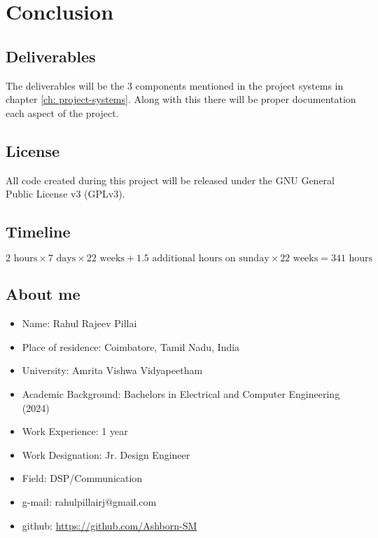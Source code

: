 \chapter{Conclusion}

\section{Deliverables}

The deliverables will be the 3 components mentioned in the project systems in chapter \ref{ch: project-systems}. Along with this there will be proper documentation each aspect of the project.

\section{License}

All code created during this project will be released under the GNU General Public License v3 (GPLv3).

\section{Timeline}

$$ 2 \text{ hours} \times 7 \text{ days} \times 22 \text{ weeks} + 1.5 \text{ additional hours on sunday} \times 22 \text{ weeks} = 341 \text{ hours}
$$
\section{About me}

\begin{itemize}
	\item Name: Rahul Rajeev Pillai
	\item Place of residence: Coimbatore, Tamil Nadu, India
	\item University: Amrita Vishwa Vidyapeetham
	\item Academic Background: Bachelors in Electrical and Computer Engineering (2024)
	\item Work Experience: 1 year
	\item Work Designation: Jr. Design Engineer
	\item Field: DSP/Communication
	\item g-mail: rahulpillairj@gmail.com
	\item github: \href{https://github.com/Ashborn-SM}{https://github.com/Ashborn-SM}
\end{itemize}

